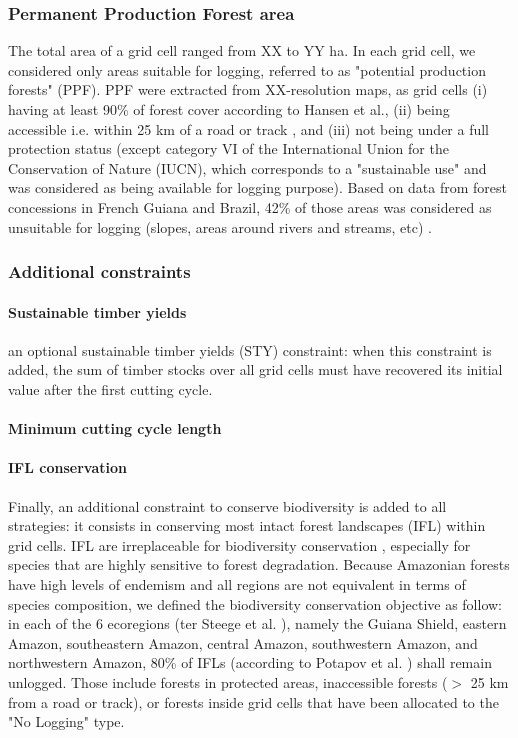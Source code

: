 \documentclass{article}
\begin{document}
\subsubsection{Permanent Production Forest area}

The total area of a grid cell ranged from XX to YY ha. In each grid cell, we considered only areas suitable for logging, referred to as "potential production forests" (PPF). PPF were extracted from XX-resolution maps, as grid cells (i) having at least 90\% of forest cover according to Hansen et al.\cite{Hansen2013}, (ii) being accessible i.e. within 25 km of a road or track \cite{OSM2018,Asner2006}, and (iii) not being under a full protection status \cite{WDPA2016} (except category VI of the International Union for the Conservation of Nature (IUCN), which corresponds to a "sustainable use" and was considered as being available for logging purpose).
Based on data from forest concessions in French Guiana and Brazil, 42\% of those areas was considered as unsuitable for logging (slopes, areas around rivers and streams, etc) \cite{Piponiotc}. 

\subsubsection{Additional constraints}

\paragraph{Sustainable timber yields}

an optional sustainable timber yields (STY) constraint: when this constraint is added, the sum of timber stocks over all grid cells must have recovered its initial value after the first cutting cycle. 

\paragraph{Minimum cutting cycle length}


\paragraph{IFL conservation}

Finally, an additional constraint  to conserve biodiversity is added to all strategies: it consists in conserving most intact forest landscapes (IFL) within grid cells. IFL are irreplaceable for biodiversity conservation \cite{Gibson2011}, especially for species that are highly sensitive to forest degradation. Because Amazonian forests have high levels of endemism and all regions are not equivalent in terms of species composition, we defined the biodiversity conservation objective as follow: in each of the 6 ecoregions (ter Steege et al. \cite{TerSteege2013}), namely the Guiana Shield, eastern Amazon, southeastern Amazon, central Amazon, southwestern Amazon, and northwestern Amazon, 80\% of IFLs (according to Potapov et al. \cite{Potapov2017}) shall remain unlogged. Those include forests in protected areas, inaccessible forests ($>$ 25 km from a road or track), or forests inside grid cells that have been allocated to the "No Logging" type. 
\end{document}
